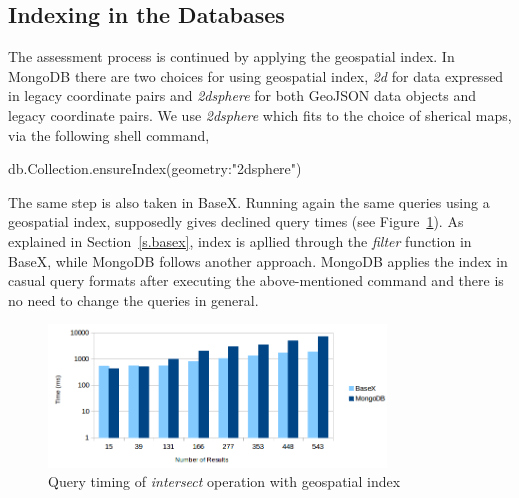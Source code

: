 \documentclass[a4paper,12pt]{article}
\begin{document}
\subsection{Indexing in the Databases}
\label{index}
The assessment process is continued by applying the geospatial index. In MongoDB there are two choices for using geospatial index, \textit{2d} for data expressed in legacy coordinate pairs and \textit{2dsphere} for both GeoJSON data objects and legacy coordinate pairs. We use \textit{2dsphere} which fits to the choice of sherical maps, via the following shell command,
\vspace{10px}
\begin{fakeJSON}
db.Collection.ensureIndex({geometry:"2dsphere"}) 
\end{fakeJSON}
\vspace{10px}
The same step is also taken in BaseX. Running again the same queries using a geospatial index, supposedly gives declined query times (see Figure~\ref{figBXvsMongoIndexIntersects}). As explained in Section~\ref{s.basex}, index is apllied through the \textit{filter} function in BaseX, while MongoDB follows another approach. MongoDB applies the index in casual query formats after executing the above-mentioned command and there is no need to change the queries in general. 


\begin{figure}
\centering
\includegraphics[width=0.8\textwidth]{BXvsMongo-Intersects-Index-log}
\caption{Query timing of \textit{intersect} operation with geospatial index}
\label{figBXvsMongoIndexIntersects}
\end{figure}

\end{document}
